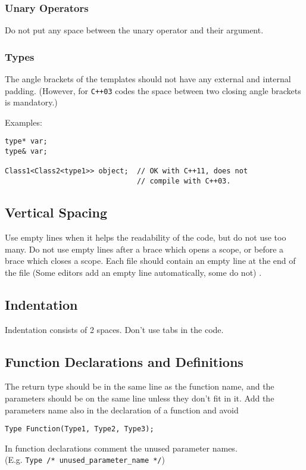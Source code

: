 \documentclass[a4paper]{article}
\newcommand{\inlinecode}[1]{\lstinline|#1|}
\begin{document}
\subsubsection{Unary Operators}

Do not put any space between the unary operator and their argument.

\subsubsection{Types}

The angle brackets of the templates should not have any external and internal padding.
(However, for \texttt{C++03} codes the space between two closing angle brackets is mandatory.)

Examples:
\begin{lstlisting}
type* var;
type& var;

Class1<Class2<type1>> object;  // OK with C++11, does not
                               // compile with C++03.
\end{lstlisting}

\subsection{Vertical Spacing}

Use empty lines when it helps the readability of the code, but do not use too many.
Do not use empty lines after a brace which opens a scope,
or before a brace which closes a scope.
Each file should contain an empty line at the end of the file (Some editors add an empty line automatically, some do not) . 

\subsection{Indentation}

Indentation consists of 2 spaces. Don't use tabs in the code.

\subsection{Function Declarations and Definitions}

The return type should be in the same line as the function name, and the parameters should be on the same line unless they don't fit in it.
Add the parameters name also in the declaration of a function and avoid
\begin{lstlisting}
Type Function(Type1, Type2, Type3);
\end{lstlisting}
In function declarations comment the unused parameter names. \\(E.g. \inlinecode{Type /* unused_parameter_name */})
\end{document}
